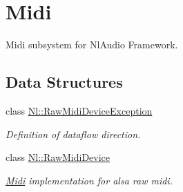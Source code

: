 \hypertarget{group__Midi}{}\section{Midi}
\label{group__Midi}


Midi subsystem for Nl\+Audio Framework.  


\subsection*{Data Structures}
\begin{DoxyCompactItemize}
\item 
class \hyperlink{classNl_1_1RawMidiDeviceException}{Nl\+::\+Raw\+Midi\+Device\+Exception}
\begin{DoxyCompactList}\small\item\em Definition of dataflow direction. \end{DoxyCompactList}\item 
class \hyperlink{classNl_1_1RawMidiDevice}{Nl\+::\+Raw\+Midi\+Device}
\begin{DoxyCompactList}\small\item\em \hyperlink{classNl_1_1Midi}{Midi} implementation for alsa raw midi. \end{DoxyCompactList}\end{DoxyCompactItemize}
